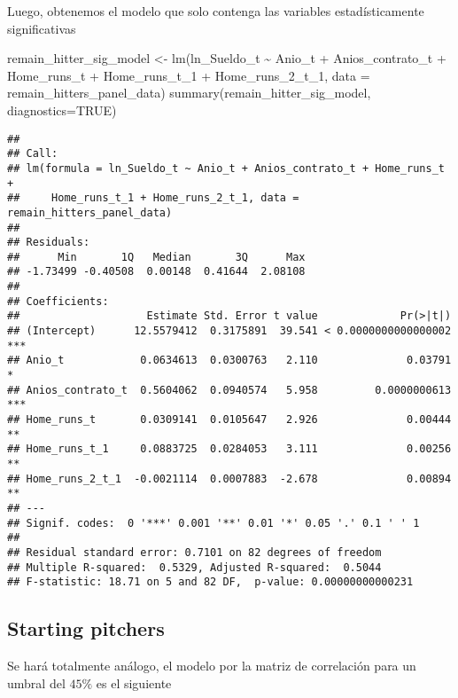 \documentclass[
]{article}
\newenvironment{Shaded}{\begin{snugshade}}{\end{snugshade}}
\newcommand{\AttributeTok}[1]{\textcolor[rgb]{0.77,0.63,0.00}{#1}}
\newcommand{\ConstantTok}[1]{\textcolor[rgb]{0.00,0.00,0.00}{#1}}
\newcommand{\FunctionTok}[1]{\textcolor[rgb]{0.00,0.00,0.00}{#1}}
\newcommand{\NormalTok}[1]{#1}
\newcommand{\OtherTok}[1]{\textcolor[rgb]{0.56,0.35,0.01}{#1}}
\newcommand{\SpecialCharTok}[1]{\textcolor[rgb]{0.00,0.00,0.00}{#1}}
\begin{document}
Luego, obtenemos el modelo que solo contenga las variables
estadísticamente significativas

\begin{Shaded}
\begin{Highlighting}[]
\NormalTok{remain\_hitter\_sig\_model }\OtherTok{\textless{}{-}} \FunctionTok{lm}\NormalTok{(ln\_Sueldo\_t }\SpecialCharTok{\textasciitilde{}}\NormalTok{ Anio\_t }\SpecialCharTok{+}\NormalTok{ Anios\_contrato\_t }\SpecialCharTok{+}\NormalTok{ Home\_runs\_t }\SpecialCharTok{+}
\NormalTok{                                      Home\_runs\_t\_1 }\SpecialCharTok{+}\NormalTok{ Home\_runs\_2\_t\_1,}
                                      \AttributeTok{data =}\NormalTok{ remain\_hitters\_panel\_data)}
\FunctionTok{summary}\NormalTok{(remain\_hitter\_sig\_model, }\AttributeTok{diagnostics=}\ConstantTok{TRUE}\NormalTok{)}
\end{Highlighting}
\end{Shaded}

\begin{verbatim}
## 
## Call:
## lm(formula = ln_Sueldo_t ~ Anio_t + Anios_contrato_t + Home_runs_t + 
##     Home_runs_t_1 + Home_runs_2_t_1, data = remain_hitters_panel_data)
## 
## Residuals:
##      Min       1Q   Median       3Q      Max 
## -1.73499 -0.40508  0.00148  0.41644  2.08108 
## 
## Coefficients:
##                    Estimate Std. Error t value             Pr(>|t|)    
## (Intercept)      12.5579412  0.3175891  39.541 < 0.0000000000000002 ***
## Anio_t            0.0634613  0.0300763   2.110              0.03791 *  
## Anios_contrato_t  0.5604062  0.0940574   5.958         0.0000000613 ***
## Home_runs_t       0.0309141  0.0105647   2.926              0.00444 ** 
## Home_runs_t_1     0.0883725  0.0284053   3.111              0.00256 ** 
## Home_runs_2_t_1  -0.0021114  0.0007883  -2.678              0.00894 ** 
## ---
## Signif. codes:  0 '***' 0.001 '**' 0.01 '*' 0.05 '.' 0.1 ' ' 1
## 
## Residual standard error: 0.7101 on 82 degrees of freedom
## Multiple R-squared:  0.5329, Adjusted R-squared:  0.5044 
## F-statistic: 18.71 on 5 and 82 DF,  p-value: 0.00000000000231
\end{verbatim}

\subsection{Starting pitchers}

Se hará totalmente análogo, el modelo por la matriz de correlación para
un umbral del \(45\%\) es el siguiente
\end{document}
